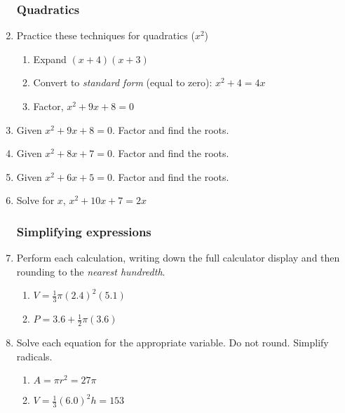 \begin{enumerate}
\subsubsection*{Quadratics}
\item Practice these techniques for quadratics ($x^2$)
  \begin{enumerate}%
    \item Expand $(x+4)(x+3)$
    \item Convert to \emph{standard form} (equal to zero): $x^2+4=4x$
    \item Factor, $x^2+9x+8=0$
  \end{enumerate}
  
\item Given $x^2+9x+8=0$. Factor and find the roots. %

\item Given $x^2+8x+7=0$. Factor and find the roots. %

\item Given $x^2+6x+5=0$. Factor and find the roots. %

\item Solve for $x$, $x^2+10x+7=2x$


\subsubsection*{Simplifying expressions}
\item Perform each calculation, writing down the full calculator display and then rounding to the \emph{nearest hundredth}.
\begin{multicols}{2}
\begin{enumerate}
  \item $V=\frac{1}{3} \pi (2.4)^2(5.1)$
  \item $P=3.6 + \frac{1}{2} \pi (3.6)$  
\end{enumerate}
\end{multicols}%

\item Solve each equation for the appropriate variable. Do not round. Simplify radicals.
\begin{multicols}{2}
\begin{enumerate}[itemsep=2cm]
  \item $A=\pi r^2=27\pi$
  \item $V=\frac{1}{3}(6.0)^2h=153$  
\end{enumerate}
\end{multicols}%


\end{enumerate}
